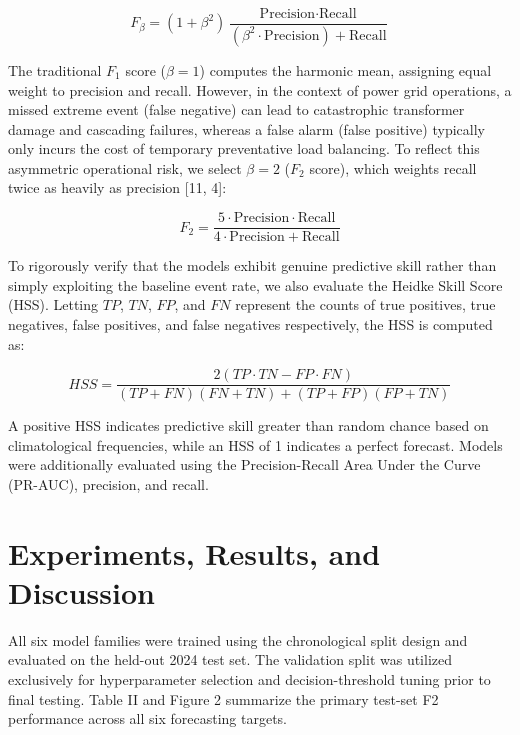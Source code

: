 \documentclass[conference]{IEEEtran}
\begin{document}
$$F_\beta = (1 + \beta^2) \frac{\text{Precision} \cdot \text{Recall}}{(\beta^2 \cdot \text{Precision}) + \text{Recall}}$$

The traditional $F_1$ score ($\beta=1$) computes the harmonic mean, assigning equal weight to precision and recall. However, in the context of power grid operations, a missed extreme event (false negative) can lead to catastrophic transformer damage and cascading failures, whereas a false alarm (false positive) typically only incurs the cost of temporary preventative load balancing. To reflect this asymmetric operational risk, we select $\beta=2$ ($F_2$ score), which weights recall twice as heavily as precision [11, 4]:

$$F_2 = \frac{5 \cdot \text{Precision} \cdot \text{Recall}}{4 \cdot \text{Precision} + \text{Recall}}$$

To rigorously verify that the models exhibit genuine predictive skill rather than simply exploiting the baseline event rate, we also evaluate the Heidke Skill Score (HSS). Letting $TP$, $TN$, $FP$, and $FN$ represent the counts of true positives, true negatives, false positives, and false negatives respectively, the HSS is computed as:

$$HSS = \frac{2(TP \cdot TN - FP \cdot FN)}{(TP + FN)(FN + TN) + (TP + FP)(FP + TN)}$$

A positive HSS indicates predictive skill greater than random chance based on climatological frequencies, while an HSS of 1 indicates a perfect forecast. Models were additionally evaluated using the Precision-Recall Area Under the Curve (PR-AUC), precision, and recall.

\section{Experiments, Results, and Discussion}

All six model families were trained using the chronological split design and evaluated on the held-out 2024 test set. The validation split was utilized exclusively for hyperparameter selection and decision-threshold tuning prior to final testing. Table II and Figure 2 summarize the primary test-set F2 performance across all six forecasting targets.
\end{document}
